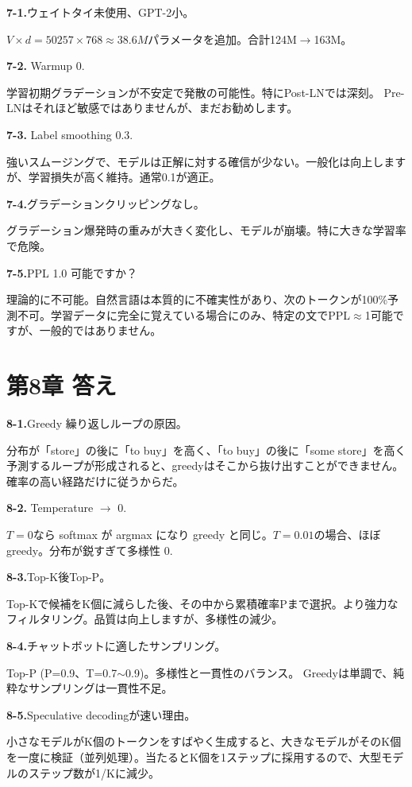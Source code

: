 \textbf{7-1.}ウェイトタイ未使用、GPT-2小。

$V \times d = 50257 \times 768 \approx 38.6M$パラメータを追加。合計124M$\to$163M。

\textbf{7-2.} Warmup 0.

学習初期グラデーションが不安定で発散の可能性。特にPost-LNでは深刻。 Pre-LNはそれほど敏感ではありませんが、まだお勧めします。

\textbf{7-3.} Label smoothing 0.3.

強いスムージングで、モデルは正解に対する確信が少ない。一般化は向上しますが、学習損失が高く維持。通常0.1が適正。

\textbf{7-4.}グラデーションクリッピングなし。

グラデーション爆発時の重みが大きく変化し、モデルが崩壊。特に大きな学習率で危険。

\textbf{7-5.}PPL 1.0 可能ですか？

理論的に不可能。自然言語は本質的に不確実性があり、次のトークンが100\%予測不可。学習データに完全に覚えている場合にのみ、特定の文でPPL$\approx$1可能ですが、一般的ではありません。

\section{第8章 答え}

\textbf{8-1.}Greedy 繰り返しループの原因。

分布が「store」の後に「to buy」を高く、「to buy」の後に「some store」を高く予測するループが形成されると、greedyはそこから抜け出すことができません。確率の高い経路だけに従うからだ。

\textbf{8-2.} Temperature $\to$ 0.

$T=0$なら softmax が argmax になり greedy と同じ。$T=0.01$の場合、ほぼgreedy。分布が鋭すぎて多様性 0.

\textbf{8-3.}Top-K後Top-P。

Top-Kで候補をK個に減らした後、その中から累積確率Pまで選択。より強力なフィルタリング。品質は向上しますが、多様性の減少。

\textbf{8-4.}チャットボットに適したサンプリング。

Top-P (P=0.9、T=0.7$\sim$0.9)。多様性と一貫性のバランス。 Greedyは単調で、純粋なサンプリングは一貫性不足。

\textbf{8-5.}Speculative decodingが速い理由。

小さなモデルがK個のトークンをすばやく生成すると、大きなモデルがそのK個を一度に検証（並列処理）。当たるとK個を1ステップに採用するので、大型モデルのステップ数が1/Kに減少。
